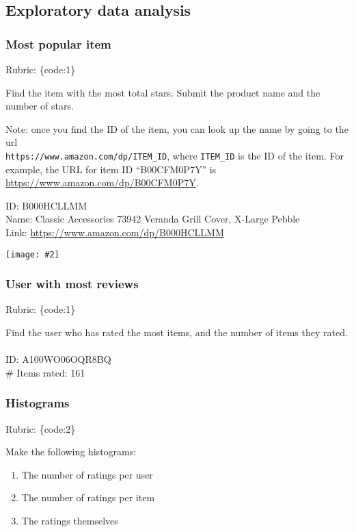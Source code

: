 \documentclass{article}
\def\rubric#1{\gre{Rubric: \{#1\}}}{}
\def\blu#1{{\color{blu}#1}}
\def\gre#1{{\color{gre}#1}}
\def\ans#1{{\color{ans}#1}}
\newcommand{\centerfig}[2]{\begin{center}\texttt{[image: \#2]}\end{center}}
\begin{document}
\subsection{Exploratory data analysis}

\subsubsection{Most popular item}
\rubric{code:1}

Find the item with the most total stars. \blu{Submit the product name and the number of stars}.

Note: once you find the ID of the item, you can look up the name by going to the url \\ \verb|https://www.amazon.com/dp/ITEM_ID|, where \verb|ITEM_ID| is the ID of the item.
For example, the URL for item ID ``B00CFM0P7Y'' is \url{https://www.amazon.com/dp/B00CFM0P7Y}. 

\ans{
    ID: B000HCLLMM\\
    Name: Classic Accessories 73942 Veranda Grill Cover, X-Large Pebble \\
    Link: \url{https://www.amazon.com/dp/B000HCLLMM} \\
}
\centerfig{1}{../figs/B000HCLLMM}

\subsubsection{User with most reviews}
\rubric{code:1}

\blu{Find the user who has rated the most items, and the number of items they rated.} \\ \\
\ans{
    ID: A100WO06OQR8BQ\\
    \# Items rated: 161 \\
}

\subsubsection{Histograms}
\rubric{code:2}

\blu{Make the following histograms:}
\begin{enumerate}
\item The number of ratings per user
\item The number of ratings per item
\item The ratings themselves
\end{enumerate}
\end{document}
